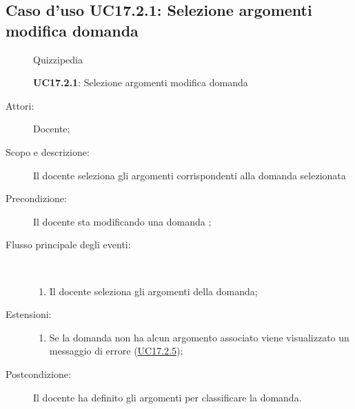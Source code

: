 \subsection{Caso d'uso UC17.2.1: Selezione argomenti modifica domanda}
\begin{figure}[H]
	\centering
	\begin{resizedtikzpicture}{\textwidth}
		\begin{umlsystem}[x=0, fill=lightgray!20]{Quizzipedia}
		\end{umlsystem}
	\end{resizedtikzpicture}
	\caption{\textbf{UC17.2.1}: Selezione argomenti modifica domanda}
	\label{UC17.2.1}
\end{figure}
\begin{description}
	\item[Attori:] Docente;
	\item[Scopo e descrizione:] Il docente seleziona gli argomenti corrispondenti alla domanda selezionata
	\item[Precondizione:] Il docente sta modificando una domanda
	;
	
	\item[Flusso principale degli eventi:] \ 
	\begin{enumerate}
		\item Il docente seleziona gli argomenti della domanda;
		
	\end{enumerate}
	\item[Estensioni:]
	\begin{enumerate}
		\item Se la domanda non ha alcun argomento associato viene visualizzato un messaggio di errore	 (\hyperlink{UC17.2.5}{UC17.2.5});
		
	\end{enumerate}
	\item[Postcondizione:] Il docente ha definito gli argomenti per classificare la domanda.
\end{description}
\hypertarget{UC17.2.2}{}
